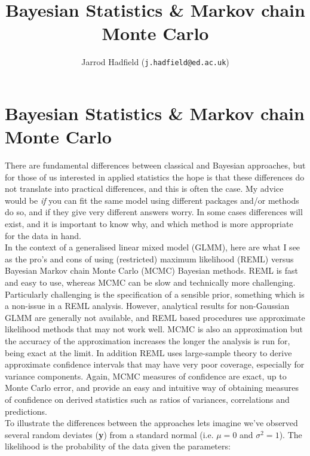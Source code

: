 \documentclass{article}
\title{Bayesian Statistics \& Markov chain Monte Carlo}
\author{Jarrod Hadfield (\texttt{j.hadfield@ed.ac.uk})}
\begin{document}
\maketitle
\else
\chapter[Bayesian Statistics \& MCMC]{Bayesian Statistics \& Markov chain Monte Carlo}
\label{chap1}
\fi




There are fundamental differences between classical and Bayesian approaches, but for those of us interested in applied statistics the hope is that these differences do not translate into practical differences, and this is often the case. My advice would be \emph{if} you can fit the same model using different packages and/or methods do so, and if they give very different answers worry. In some cases differences will exist, and it is important to know why, and which method is more appropriate for the data in hand.\\

In the context of a generalised linear mixed model (GLMM), here are what I see as the pro's and cons of using (restricted) maximum likelihood (REML) versus Bayesian Markov chain Monte Carlo (MCMC) Bayesian methods. REML is fast and easy to use, whereas MCMC can be slow and technically more challenging. Particularly challenging is the specification of a sensible prior, something which is a non-issue in a REML analysis. However, analytical results for non-Gaussian GLMM are generally not available, and REML based procedures use approximate likelihood methods that may not work well. MCMC is also an approximation but the accuracy of the approximation increases the longer the analysis is run for, being exact at the limit. In addition REML uses large-sample theory to derive approximate confidence intervals that may have very poor coverage, especially for variance components.  Again, MCMC measures of confidence are exact, up to Monte Carlo error, and provide an easy and intuitive way of obtaining measures of confidence on derived statistics such as ratios of variances, correlations and predictions.\\
 

To illustrate the differences between the approaches lets imagine we've observed several random deviates ({\bf y}) from a standard normal (i.e. $\mu=0$ and $\sigma^{2}=1$).  The likelihood is the probability of the data given the parameters:
\end{document}
